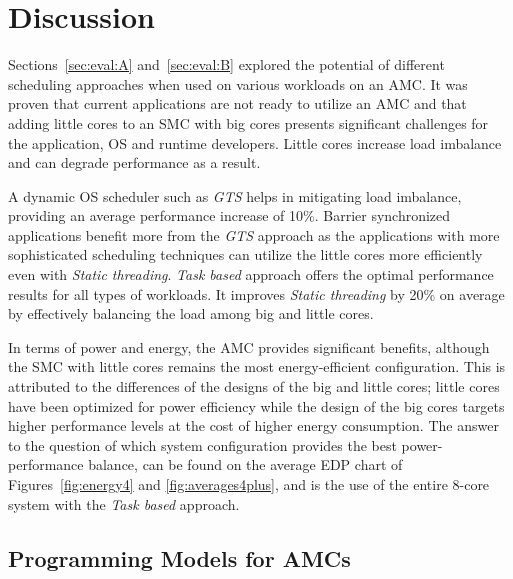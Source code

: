 \section*{Discussion}
Sections~\ref{sec:eval:A} and~\ref{sec:eval:B} explored the potential of different scheduling approaches when used on various workloads on an AMC. 
It was proven that current applications are not ready to utilize an AMC and that adding little cores to an SMC with big cores presents significant challenges for the application, OS and runtime developers. 
Little cores increase load imbalance and can degrade performance as a result. 


A dynamic OS scheduler such as \emph{GTS} helps in mitigating load imbalance, providing an average performance increase of 10\%.
Barrier synchronized applications benefit more from the \emph{GTS} approach as the applications with more sophisticated scheduling techniques can utilize the little cores more efficiently even with \emph{Static threading}.
\emph{Task based} approach offers the optimal performance results for all types of workloads.
It improves \emph{Static threading} by 20\% on average by effectively balancing the load among big and little cores.


In terms of power and energy, the AMC provides significant benefits, although the SMC with little cores remains the most energy-efficient configuration. 
This is attributed to the differences of the designs of the big and little cores; little cores have been optimized for power efficiency while the design of the big cores targets higher performance levels at the cost of higher energy consumption.
The answer to the question of which system configuration provides the best power-performance balance, can be found on the average EDP chart of Figures~\ref{fig:energy4} and \ref{fig:averages4plus}, and is the use of the entire 8-core system with the \emph{Task based} approach.

\subsection{Programming Models for AMCs}

